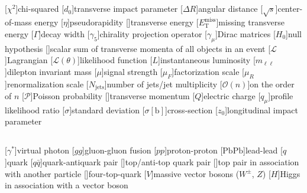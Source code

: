 \documentclass[thesis.tex]{subfiles}
\begin{document}
\begin{abbrev}

\subsection*{}
\begin{acronym}
[\ensuremath{\chi^2}\xspace]{chi-squared}
[\ensuremath{d_0}\xspace]{transverse impact parameter}
[\ensuremath{\Delta R}\xspace]{angular distance}
[\ensuremath{\sqrt{s}}\xspace]{center-of-mass energy}
[\ensuremath{\eta}\xspace]{pseudorapidity}
[\ET]{transverse energy}
[\ensuremath{E_\mathrm{T}^\mathrm{miss}}\xspace]{missing transverse energy}
[\ensuremath{\Gamma}\xspace]{decay width}
[\ensuremath{\gamma_5}\xspace]{chirality projection operator}
[\ensuremath{\gamma_\mu}\xspace]{Dirac matrices}
[\ensuremath{H_0}\xspace]{null hypothesis}
[\HT]{scalar sum of transverse momenta \pT of all objects in an event}
[\ensuremath{\mathcal{L}}\xspace]{Lagrangian}
[\ensuremath{\mathcal{L}(\theta)}\xspace]{likelihood function}
[$L$]{instantaneous luminosity}
[\ensuremath{m_{\ell\ell}}\xspace]{dilepton invariant mass}
[\ensuremath{\mu}\xspace]{signal strength}
[\ensuremath{\mu_F}\xspace]{factorization scale}
[\ensuremath{\mu_R}\xspace]{renormalization scale}
[\ensuremath{N_\mathrm{jets}}\xspace]{number of jets/jet multiplicity}
[\ensuremath{\mathcal{O}(n)}\xspace]{on the order of $n$}
[\ensuremath{\mathcal{P}}\xspace]{Poisson probability}
[\pT]{transverse momentum}
[\ensuremath{Q}\xspace]{electric charge}
[\ensuremath{q_\mu}\xspace]{profile likelihood ratio}
[\ensuremath{\sigma}\xspace]{standard deviation}
[\ensuremath{\sigma\mathrm{[b]}}\xspace]{cross-section}
[\ensuremath{z_0}\xspace]{longitudinal impact parameter}
\end{acronym}

\subsection*{}
\begin{acronym}
[\ensuremath{\gamma^*}\xspace]{virtual photon}
[\ensuremath{gg}\xspace]{gluon-gluon fusion}
[\ensuremath{pp}\xspace]{proton-proton}
[\ensuremath{\mathrm{PbPb}}\xspace]{lead-lead}
[\ensuremath{q}\xspace]{quark}
[\ensuremath{q\bar{q}}\xspace]{quark-antiquark pair}
[\ttbar]{top/anti-top quark pair}
[\ttbar]{top pair in association with another particle}
[\tttt]{four-top-quark}
[\ensuremath{V}\xspace]{massive vector bosons ($W^\pm$, $Z$)}
[\ensuremath{H}\xspace]{Higgs in association with a vector boson}
\end{acronym}


\end{abbrev}
\end{document}
